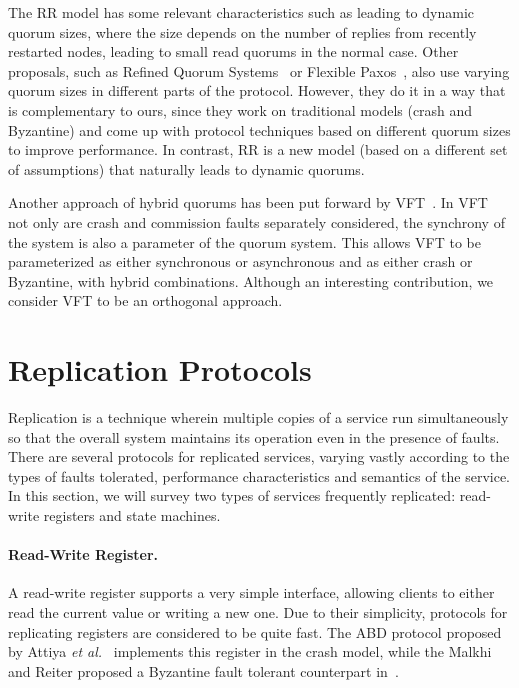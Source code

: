 The \ac{RR} model has some relevant characteristics such as
leading to dynamic quorum sizes, where the size depends on the
number of replies from recently restarted nodes, leading to small
read quorums in the normal case. Other proposals, such as Refined
Quorum Systems~\cite{rqs} or Flexible Paxos~\cite{fp},  also use
varying quorum sizes in different parts of the protocol. However,
they do it in a way that is complementary to ours, since they
work on traditional models (crash and Byzantine) and come up with
protocol techniques based on different quorum sizes to improve
performance. In contrast, \ac{RR} is a new model (based on a
different set of assumptions) that naturally leads to dynamic
quorums.

Another approach of hybrid quorums has been put forward by
\ac{VFT}~\cite{visigoth}. In \ac{VFT} not only are crash and
commission faults separately considered, the synchrony of the
system is also a parameter of the quorum system. This allows
\ac{VFT} to be parameterized as either synchronous or asynchronous
and as either crash or Byzantine, with hybrid combinations.
Although an interesting contribution, we consider \ac{VFT} to be
an orthogonal approach.

\section{Replication Protocols}
Replication is a technique wherein multiple copies of a service run
simultaneously so that the overall system maintains its operation
even in the presence of faults. There are several protocols for
replicated services, varying vastly according to the types of
faults tolerated, performance characteristics and semantics of
the service. In this section, we will survey two types of
services frequently replicated: read-write registers and state
machines.

\paragraph{Read-Write Register.} A read-write register supports a
very simple interface, allowing clients to either read the
current value or writing a new one. Due to their simplicity,
protocols for replicating registers are considered to be quite
fast. The ABD protocol proposed by Attiya
\emph{et al.}~\cite{abd} implements this register in the crash
model, while the Malkhi and Reiter proposed a Byzantine fault tolerant
counterpart in~\cite{bqs}.


